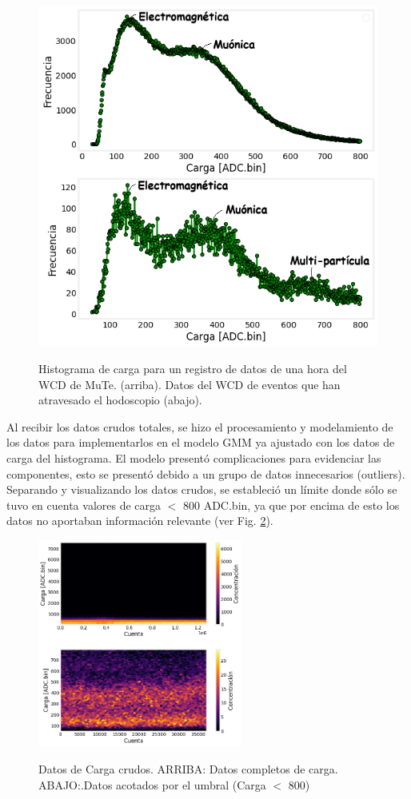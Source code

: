 \begin{figure}[h!]
\begin{center}
\caption {Histograma de carga para un registro de datos de una hora del WCD de MuTe. (arriba).  Datos del WCD de eventos que han atravesado el hodoscopio (abajo).}
\includegraphics[width=0.7
\textwidth]{Figures/imagenes/1.png}
\label{uno}
\end{center}
\end{figure}

Al recibir los datos crudos totales, se hizo el procesamiento y modelamiento de los datos para implementarlos en el modelo GMM ya ajustado con los datos de carga del histograma. El modelo presentó complicaciones para evidenciar las componentes, esto se presentó debido a un grupo de datos innecesarios (outliers). Separando y visualizando los datos crudos, se estableció un límite donde sólo se tuvo en cuenta valores de carga $<$ 800 ADC.bin, ya que por encima de esto los datos no aportaban información relevante (ver Fig. \ref{dos}).

\begin{figure}[h]
\begin{center}
\caption{Datos de Carga crudos. ARRIBA: Datos completos de carga.  ABAJO:.Datos acotados por el umbral (Carga $<$ 800)}
\includegraphics[width=0.6\textwidth]{Figures/imagenes/2.png}
\label{dos}
\end{center}
\end{figure}


